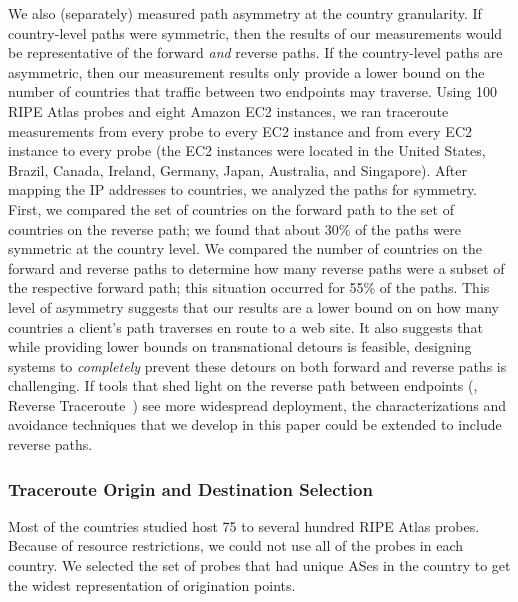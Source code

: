 We also (separately)
measured path asymmetry at the country granularity. If country-level paths
were symmetric, then the results of our measurements would be representative
of the forward {\it and} reverse paths. If the country-level paths are
asymmetric, then our measurement results only provide a lower bound on the
number of countries that traffic between two endpoints may traverse.  Using
100 RIPE Atlas probes and eight Amazon EC2 instances,
we ran traceroute measurements from every probe to every EC2 instance and from
every EC2 instance to every probe (the EC2 instances were located in the United States, Brazil, 
Canada, Ireland, Germany, Japan, Australia, and Singapore).  After mapping the IP addresses to countries, we
analyzed the paths for symmetry.  First, we compared the set of countries on
the forward path to the set of countries on the reverse path; we found that about 30\% of the 
paths were symmetric at the country level.  We compared the number of countries on the forward and
reverse paths to determine how many reverse paths were a subset of the
respective forward path; this situation occurred for 55\% of the paths. This
level of asymmetry suggests that our results are a lower bound on on how many countries a client's 
path traverses en route to a web site. It also suggests that
while providing lower bounds on transnational detours is feasible, designing
systems to {\em completely} prevent these detours on both forward and reverse
paths is challenging. If tools that shed light on the reverse path
between endpoints (\eg, Reverse Traceroute~\cite{katz2010reverse}) see more widespread deployment,
the characterizations and avoidance techniques that we develop in this paper could
be extended to include reverse paths.

\subsubsection{Traceroute Origin and Destination Selection}

Most of the countries studied host 75 to several hundred RIPE Atlas probes.  Because of resource
restrictions, we could not use all of the probes in each country.  We
selected the set of probes that had unique ASes in the country to get
the widest representation of origination points.

